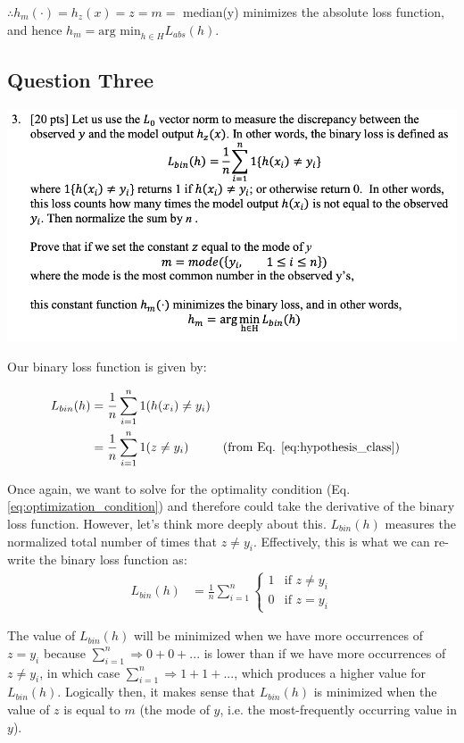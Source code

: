 $\therefore h_m(\cdot) = h_z(x) = z = m =$ median(y) minimizes the absolute loss function, and hence $h_m = \text{arg min}_{h \in H} L_{abs}(h)$.

\subsection{Question Three}
\includegraphics[width=1\textwidth]{media/q3.png}

Our binary loss function is given by:

\begin{align}
    L_{bin}(h) &= \frac{1}{n} \sum_{i=1}^n 1 ( h(x_i) \neq y_i )  \nonumber \\
    &= \frac{1}{n} \sum_{i=1}^n 1 ( z \neq y_i ) && \text{(from Eq. \ref{eq:hypothesis_class})} 
\end{align}

Once again, we want to solve for the optimality condition (Eq. \ref{eq:optimization_condition}) and therefore could take the derivative of the binary loss function. However, let's think more deeply about this. $L_{bin}(h)$ measures the normalized total number of times that $z \neq y_i$. Effectively, this is what we can re-write the binary loss function as:
\begin{align}
    L_{bin}(h) &= \frac{1}{n} \sum_{i=1}^n \begin{cases} 
        1 & \text{if } z \neq y_i \\
        0 & \text{if } z = y_i
    \end{cases} \nonumber \label{eq:q3_deriv2} 
\end{align}

The value of $L_{bin}(h)$ will be minimized when we have more occurrences of $z = y_i$ because $\sum_{i=1}^n \Rightarrow 0 + 0 + ...$ is lower than if we have more occurrences of $z \neq y_i$, in which case $\sum_{i=1}^n \Rightarrow 1 + 1 + ...$, which produces a higher value for $L_{bin}(h)$. Logically then, it makes sense that $L_{bin}(h)$ is minimized when the value of $z$ is equal to $m$ (the mode of $y$, i.e. the most-frequently occurring value in $y$). 

